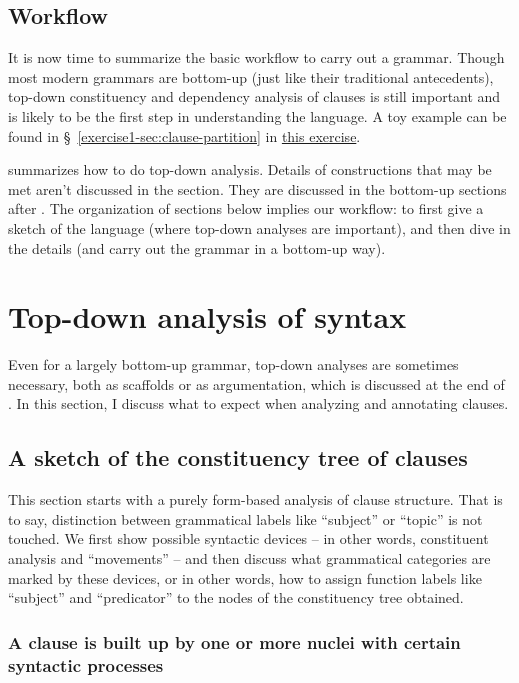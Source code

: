 \documentclass[UTF8, a4paper, oneside, scheme=plain]{ctexart}
\newcommand*{\citesec}[1]{\S~{#1}}
\newcommand{\exerciseone}{\href{../Exercise/2021-3.pdf}{this exercise}}
\begin{document}
\subsection{Workflow}

It is now time to summarize the basic workflow to carry out a grammar.
Though most modern grammars are bottom-up (just like their traditional antecedents),
top-down constituency and dependency analysis of clauses is still important
and is likely to be the first step in understanding the language.
A toy example can be found in \citesec{\ref{exercise1-sec:clause-partition}} in \exerciseone.

 summarizes how to do top-down analysis.
Details of constructions that may be met aren't discussed in the section.
They are discussed in the bottom-up sections after .
The organization of sections below implies our workflow:
to first give a sketch of the language (where top-down analyses are important),
and then dive in the details (and carry out the grammar in a bottom-up way).

\section{Top-down analysis of syntax}\label{sec:top-down}

Even for a largely bottom-up grammar,
top-down analyses are sometimes necessary,
both as scaffolds or as argumentation,
which is discussed at the end of .
In this section, I discuss what to expect when analyzing and annotating clauses.

\subsection{A sketch of the constituency tree of clauses}\label{sec:ica-clause}

This section starts with a purely form-based analysis of clause structure.
That is to say, distinction between grammatical labels like ``subject'' or ``topic''
is not touched.
We first show possible syntactic devices 
-- in other words, constituent analysis and ``movements'' --
and then discuss what grammatical categories are marked by these devices,
or in other words, 
how to assign function labels like ``subject'' and ``predicator''
to the nodes of the constituency tree obtained.

\subsubsection{A clause is built up by one or more nuclei with certain syntactic processes}\label{sec:nucleus-to-clause}
\end{document}
